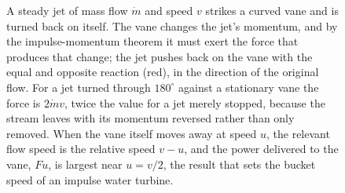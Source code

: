 \begin{figure}[htbp]
\centering
{}
\caption[A jet turned by a curved vane]{A steady jet of mass flow
$\dot{m}$ and speed $v$ strikes a curved vane and is turned back on
itself. The vane changes the jet's momentum, and by the
impulse-momentum theorem it must exert the force that produces that
change; the jet pushes back on the vane with the equal and opposite
reaction (red), in the direction of the original flow. For a jet turned
through $180^{\circ}$ against a stationary vane the force is $2\dot{m}v$,
twice the value for a jet merely stopped, because the stream leaves with
its momentum reversed rather than only removed. When the vane itself
moves away at speed $u$, the relevant flow speed is the relative speed
$v-u$, and the power delivered to the vane, $F u$, is largest near
$u=v/2$, the result that sets the bucket speed of an impulse water
turbine.}
\label{fig:vol03ch04:jet-vane}
\end{figure}
